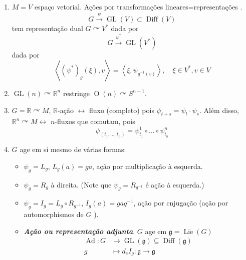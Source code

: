 \begin{example}\leavevmode 
	\begin{enumerate}
		\item $M=V$  espaço vetorial. Ações  por transformações  lineares=representações .
			\[G\overset{\psi}{\longrightarrow}\operatorname{GL}(V)\subset \operatorname{Diff}(V)\]
			tem representação dual  $G\curvearrowright V^*$ dada por
			\[G\overset{\psi^*}{\longrightarrow}\operatorname{GL}(V^*)\]
			dada por
			\[\left<(\psi^*)_g(\xi ),v\right> =\left<\xi,\psi_{g ^{-1}(v)}\right> ,\quad \xi \in V^*,v\in V\]
	
		\item $\operatorname{GL}(n)\curvearrowright \mathbb{R}^{n}$ restringe $\operatorname{O}(n)\curvearrowright S^{n-1}$.

		\item $G=\mathbb{R}\curvearrowright M$, $\mathbb{R}$-ação $\longleftrightarrow $ fluxo (completo) pois $\psi_{t+s}=\psi_t\cdot \psi_s$. Além disso, $\mathbb{R}^{n}\curvearrowright M \longleftrightarrow $ $n$-fluxos que comutam, pois
		\[\psi_{(t_1,\ldots,t_n)}=\psi_{t_1}^1\circ \ldots \circ \psi^n_{t_n}\]

	\item $G$ age em si mesmo de várias formas:
		\begin{itemize}
		\item $\psi_g=L_g$, $L_g(a)=ga$, ação por multiplicação à esquerda.

		\item $\psi_g=R_g$ à direita. (Note que  $\psi_g=R_{g ^{-1}}$ é ação à esquerda.)

		\item $\psi_g=I_g=L_g\circ R_{g ^{-1}}$, $ I_g(a)=gaq ^{-1}$, ação por cnjugação (ação por automorphismos de $G$ ).

		\item \textit{\textbf{Ação ou representação adjunta}}. $G$ age em $\mathfrak{g} =\operatorname{Lie}(G)$
			\begin{align*}
				\operatorname{Ad}: G &\longrightarrow \operatorname{GL}(\mathfrak{g})\subseteq \operatorname{Diff}(\mathfrak{g}) \\
				g &\longmapsto d_e I_g:\mathfrak{g} \to \mathfrak{g}
			\end{align*}
			

\end{itemize}
\end{enumerate}
\end{example}

